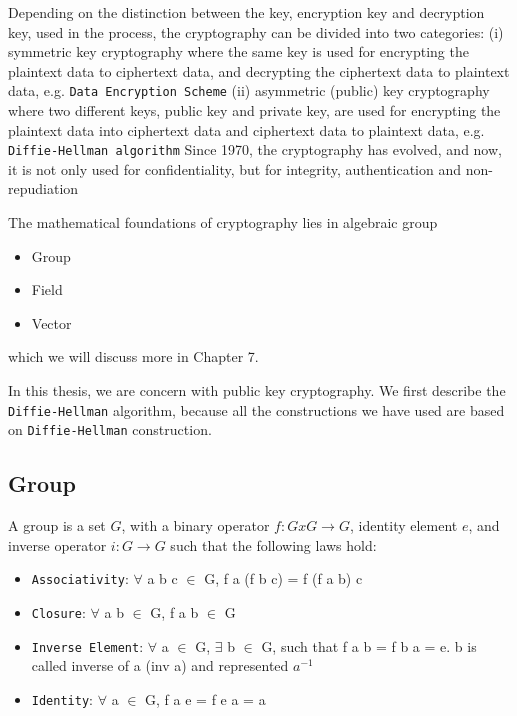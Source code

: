     Depending on the distinction between the key, encryption key and decryption key, 
    used in the process, the cryptography can be 
    divided into two categories: (i) symmetric key cryptography where the 
    same key is used for encrypting the plaintext data to ciphertext  data, and decrypting 
    the ciphertext data to plaintext data, e.g. \texttt{Data Encryption Scheme}  
    (ii) asymmetric (public) key cryptography where 
    two different keys, public key and private key, are used for encrypting the plaintext 
    data into ciphertext data and ciphertext data to plaintext data, e.g. \texttt{Diffie-Hellman algorithm} 
   Since 1970, the cryptography has evolved, and now, it is not only used for confidentiality, but 
   for integrity, authentication and non-repudiation
   
   The mathematical foundations of cryptography lies in algebraic group
   \begin{itemize}
     \item Group
     \item Field 
     \item Vector 
    \end{itemize}
    
    which we will discuss more in Chapter 7. 
    
    In this thesis, we are concern with public key cryptography. We first describe the \texttt{Diffie-Hellman} \citep{Diffie:2006:NDC:2263321.2269104}
    algorithm, because all the constructions we have used  are based on \texttt{Diffie-Hellman} construction. 
    
    \subsection{Group}
    A group is a set $G$, with a binary operator $f : G x G \rightarrow G$, identity element $e$, and inverse operator $i : G \rightarrow G$ such 
    that the following laws hold: 
    \begin{itemize}
     \item \texttt{Associativity}: $\forall$ a b c $\in$ G, f a (f b c) = f (f a b) c
    \item \texttt{Closure}: $\forall$ a b $\in$ G, f a b $\in$ G
    \item \texttt{Inverse Element}: $\forall$ a $\in$ G, $\exists$ b $\in$ G, such that f a b = f b a = e. b is called inverse of a (inv a) and represented $a^{-1}$
    \item \texttt{Identity}: $\forall$ a $\in$ G, f a e = f e a  = a 
    \end{itemize}
   
